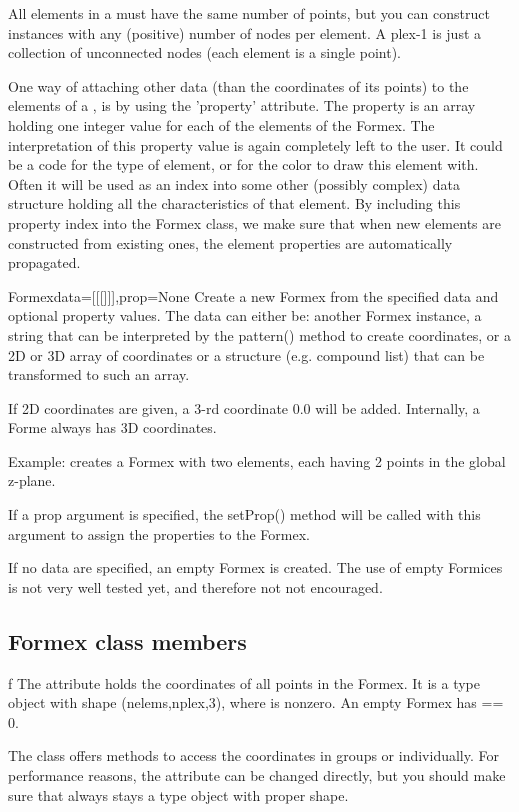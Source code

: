 All elements in a  must have the same number of points, but you can construct  instances with any (positive) number of nodes per element. A plex-1  is just a collection of unconnected nodes (each element is a single point).

One way of attaching other data (than the coordinates of its points) to the elements of a , is by using the 'property' attribute. The property is an array holding one integer value for each of the elements of the Formex. The interpretation of this property value is again completely left to the user. It could be a code for the type of element, or for the color to draw this element with. Often it will be used as an index into some other (possibly complex) data structure holding all the characteristics of that element. 
By including this property index into the Formex class, we make sure that when new elements are constructed from existing ones, the element properties are automatically propagated.


\begin{classdesc}{Formex}{data=[[[]]],prop=None}
Create a new Formex from the specified data and optional property values.
The data can either be: another Formex instance, a string that can be 
interpreted by the pattern() method to create coordinates, or a 2D or 3D array
of coordinates or a structure (e.g. compound list) that can be transformed to
such an array.
 
If 2D coordinates are given, a 3-rd coordinate 0.0 will be added.
Internally, a Forme always has 3D coordinates.
      
Example: 
creates a Formex with two elements, each having 2 points in the global z-plane.

If a prop argument is specified, the setProp() method will be called with this
argument to assign the properties to the Formex.

If no data are specified, an empty Formex is created. The use of empty Formices
is not very well tested yet, and therefore not not encouraged.
\end{classdesc}

\subsection{Formex class members}

\begin{memberdesc}{f}
The attribute  holds the coordinates of all points in the Formex.
It is a  type object with shape (nelems,nplex,3), where  is nonzero. An empty Formex has  == 0.

The class offers methods to access the coordinates in groups or individually.
For performance reasons, the attribute can be changed directly, but you should make sure that  always stays a  type object with proper shape.
\end{memberdesc}

